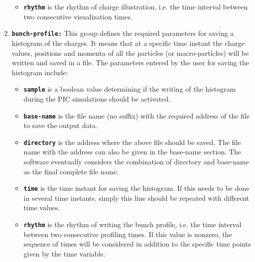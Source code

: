 \begin{enumerate}
\begin{itemize}
	\item \textbf{\texttt{rhythm}} is the rhythm of charge illustration, i.e. the time interval between two consecutive visualization times.
\end{itemize}
\item \textbf{\texttt{bunch-profile:}} This group defines the required parameters for saving a histogram of the charges. It means that at a specific time instant the charge values, positions and momenta of all the particles (or macro-particles) will be written and saved in a file. The parameters entered by the user for saving the histogram include:
\begin{itemize}
	\item \textbf{\texttt{sample}} is a boolean value determining if the writing of the histogram during the PIC simulations should be activated.
	\item \textbf{\texttt{base-name}} is the file name (no suffix) with the required address of the file to save the output data.
	\item \textbf{\texttt{directory}} is the address where the above file should be saved. The file name with the address can also be given in the base-name section. The software eventually considers the combination of directory and base-name as the final complete file name.
	\item \textbf{\texttt{time}} is the time instant for saving the histogram. If this needs to be done in several time instants, simply this line should be repeated with different time values.
    \item \textbf{\texttt{rhythm}} is the rhythm of writing the bunch profile, i.e. the time interval between two consecutive profiling times. If this value is nonzero, the sequence of times will be considered in addition to the specific time points given by the time variable.
\end{itemize}
\end{enumerate}

